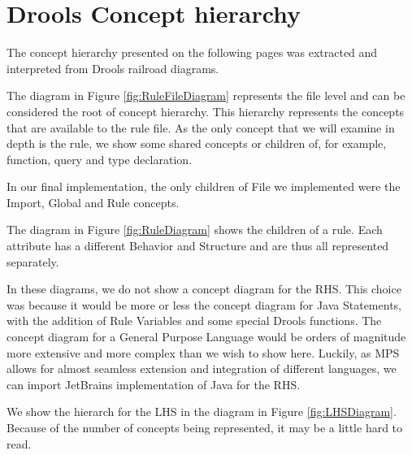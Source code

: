 \chapter{Drools Concept hierarchy}
\label{appendix:DroolsConceptHierarchy}

The concept hierarchy presented on the following pages was extracted and interpreted from Drools railroad diagrams.

The diagram in Figure \ref{fig:RuleFileDiagram} represents the file level and can be considered the root of concept hierarchy.
This hierarchy represents the concepts that are available to the rule file.
As the only concept that we will examine in depth is the rule, we show some shared concepts or children of, for example, function, query and type declaration.

In our final implementation, the only children of File we implemented were the Import, Global and Rule concepts.

The diagram in Figure \ref{fig:RuleDiagram} shows the children of a rule.
Each attribute has a different Behavior and Structure and are thus all represented separately.

In these diagrams, we do not show a concept diagram for the RHS.
This choice was because it would be more or less the concept diagram for Java Statements, with the addition of Rule Variables and some special Drools functions.
The concept diagram for a General Purpose Language would be orders of magnitude more extensive and more complex than we wish to show here.
Luckily, as MPS allows for almost seamless extension and integration of different languages, we can import JetBrains implementation of Java for the RHS.

We show the hierarch for the LHS in the diagram in Figure \ref{fig:LHSDiagram}.
Because of the number of concepts being represented, it may be a little hard to read.

 

